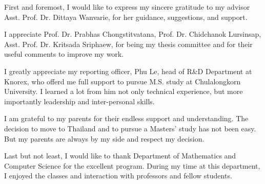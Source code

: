 \begin{acknowledgements}
First and foremost, I would like to express my sincere gratitude to my advisor Asst. Prof. Dr. Dittaya Wanvarie, for her guidance, suggestions, and support.

I appreciate Prof. Dr. Prabhas Chongstitvatana, Prof. Dr. Chidchanok Lursinsap, Asst. Prof. Dr. Kritsada Sriphaew, for being my thesis committee and for their useful comments to improve my work. 
 
I greatly appreciate my reporting officer, Phu Le, head of R\&D Department at Knorex, who offerd me full support to pursue M.S. study at Chulalongkorn University. I learned a lot from him not only technical experience, but more importantly leadership and inter-personal skills.

 I am grateful to my parents for their endless support and understanding. The decision to move to Thailand and to pursue a Masters' study has not been easy. But my parents are always by my side and respect my decision.

Last but not least, I would like to thank Department of Mathematics and Computer Science for the excellent program. During my time at this department, I enjoyed the classes and interaction with professors and fellow students. 

\end{acknowledgements}
